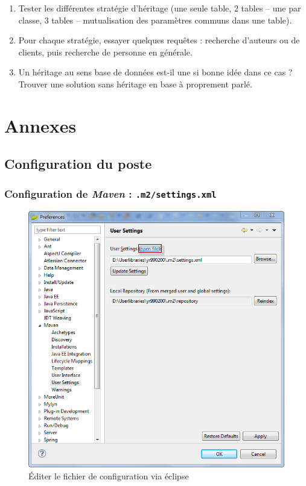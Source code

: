 \documentclass[small,algo]{dushClass} %
\begin{document}
\begin{enumerate}
\item Tester les différentes stratégie d'héritage (une seule table, 2 tables -- une par classe, 3 tables -- mutualisation des paramètres communs dans une table).
\item Pour chaque stratégie, essayer quelques requêtes : recherche d'auteurs ou de clients, puis recherche de personne en générale.
\item Un héritage au sens base de données est-il une si bonne idée dans ce cas ? Trouver une solution sans héritage en base à proprement parlé.
\end{enumerate}

\cleardoublepage
\section{Annexes}
\lstset{language=XML}

\subsection{Configuration du poste}

\subsubsection{Configuration de \emph{Maven} : \texttt{.m2/settings.xml}}\label{mvn-settings}

\begin{figure}[H]\label{mvn-settings-sts}
	\center
	\includegraphics{images/mvn_config.png}
	\caption{Éditer le fichier de configuration via éclipse}
\end{figure}
\end{document}
